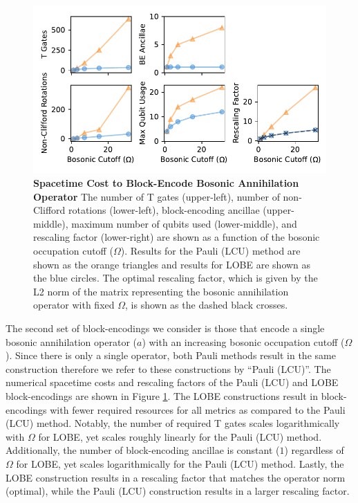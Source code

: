 \begin{figure}
    \centering
    \includegraphics[width=14cm]{figures/bosonic-comparison.pdf}
    \caption{
        \textbf{Spacetime Cost to Block-Encode Bosonic Annihilation Operator}
        The number of T gates (upper-left), number of non-Clifford rotations (lower-left), block-encoding ancillae (upper-middle), maximum number of qubits used (lower-middle), and rescaling factor (lower-right) are shown as a function of the bosonic occupation cutoff ($\Omega$).
        Results for the Pauli (LCU) method are shown as the orange triangles and results for LOBE are shown as the blue circles.
        The optimal rescaling factor, which is given by the L2 norm of the matrix representing the bosonic annihilation operator with fixed $\Omega$, is shown as the dashed black crosses. 
    }
    \label{fig:bosonic-comparison}
\end{figure}

The second set of block-encodings we consider is those that encode a single bosonic annihilation operator ($a$) with an increasing bosonic occupation cutoff ($\Omega$).
Since there is only a single operator, both Pauli methods result in the same construction therefore we refer to these constructions by ``Pauli (LCU)''.
The numerical spacetime costs and rescaling factors of the Pauli (LCU) and LOBE block-encodings are shown in Figure \ref{fig:bosonic-comparison}.
The LOBE constructions result in block-encodings with fewer required resources for all metrics as compared to the Pauli (LCU) method.
Notably, the number of required T gates scales logarithmically with $\Omega$ for LOBE, yet scales roughly linearly for the Pauli (LCU) method.
Additionally, the number of block-encoding ancillae is constant ($1$) regardless of $\Omega$ for LOBE, yet scales logarithmically for the Pauli (LCU) method.
Lastly, the LOBE construction results in a rescaling factor that matches the operator norm (optimal), while the Pauli (LCU) construction results in a larger rescaling factor.

